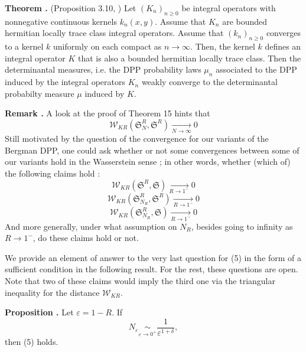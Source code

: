 \documentclass[11pt]{article}
\newcounter{cnt}
\newcommand{\cnt}{\thecnt \stepcounter{cnt}}
\begin{document}
\textbf{Theorem \cnt.} (Proposition 3.10, \cite{ShiraiTakahashi2003})
Let $(K_n)_{n \ge 0}$ be integral operators with nonnegative continuous kernels $k_n(x,y)$. Assume that $K_n$ are bounded hermitian locally trace class integral operators. Assume that $(k_n)_{n \ge 0}$ converges to a kernel $k$ uniformly on each compact as $n \to \infty$. Then, the kernel $k$ defines an integral operator $K$ that is also a bounded hermitian locally trace class. Then the determinantal measures, i.e. the DPP probability laws $\mu_n$ associated to the DPP induced by the integral operators $K_n$ weakly converge to the determinantal probabilty measure $\mu$ induced by $K$.

\textbf{Remark \cnt.} A look at the proof of Theorem 15 hints that
\begin{equation}
\mathcal W_{KR} ( \mathfrak S^R_{N}, \mathfrak S^R ) \xrightarrow[N \to \infty]{} 0    
\end{equation}
Still motivated by the question of the convergence for our variants of the Bergman DPP, one could ask whether or not some convergences between some of our variants hold in the Wasserstein sense ; in other words, whether (which of) the following claims hold :
\begin{equation}
\mathcal W_{KR} ( \mathfrak S^R, \mathfrak S) \xrightarrow[R \to 1^-]{} 0
\end{equation}
\begin{equation}
\mathcal W_{KR} ( \mathfrak S^R_{N_R}, \mathfrak S^R ) \xrightarrow[R \to 1^-]{} 0
\end{equation}
\begin{equation}
\mathcal W_{KR} ( \mathfrak S^R_{N_R}, \mathfrak S ) \xrightarrow[R \to 1^-]{} 0
\end{equation}
And more generally, under what assumption on $ N_R $, besides going to infinity as $ R \to 1^- $, do these claims hold or not. 

We provide an element of answer to the very last question for (5) in the form of a sufficient condition in the following result. For the rest, these questions are open. Note that two of these claims would imply the third one via the triangular inequality for the distance $ \mathcal W_{KR} $.

\textbf{Proposition \cnt.} Let $ \varepsilon = 1 - R $. If 
\begin{equation}
N_\varepsilon \underset{\varepsilon \to 0^+}{\sim} \frac{1}{\varepsilon^{1+\delta}},
\end{equation}
then (5) holds.
\end{document}
